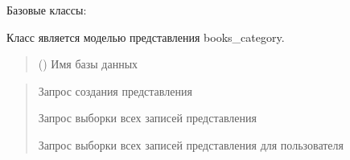 \documentclass[letterpaper,10pt,russian]{sphinxmanual}
\begin{document}
\begin{fulllineitems}
\label{\detokenize{database.sqlite3_interface.views:database.sqlite3_interface.views.view_books.ViewBooks}}
\pysigstartsignatures
{}
\pysigstopsignatures
\sphinxAtStartPar
Базовые классы: {\hyperref[\detokenize{database.sqlite3_interface.views:database.sqlite3_interface.views.view.View}]{}}

\sphinxAtStartPar
Класс является моделью представления books\_category.
\begin{quote}\begin{description}
\sphinxAtStartPar
{} () \textendash{} Имя базы данных

\end{description}\end{quote}
\begin{description}
\begin{quote}\begin{description}
\sphinxAtStartPar
Запрос создания представления

\sphinxAtStartPar
Запрос выборки всех записей представления

\sphinxAtStartPar
Запрос выборки всех записей представления для пользователя

\end{description}\end{quote}


\end{description}
\end{fulllineitems}
\end{document}
